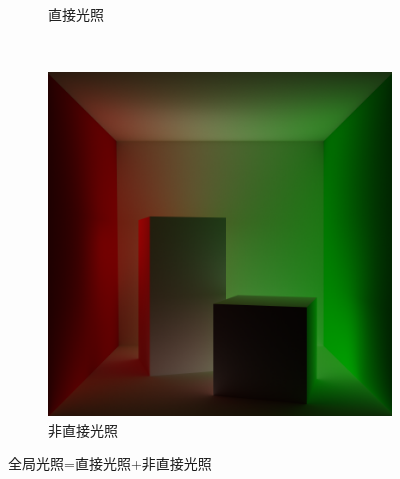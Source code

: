 \begin{figure}[h]
\begin{subfigure}{0.3\textwidth}
        \caption{直接光照}
    \end{subfigure}
    ~
    \begin{subfigure}{0.3\textwidth}
        \includegraphics[width=\textwidth]{img/indirect.png}
        \caption{非直接光照}
    \end{subfigure}
    \caption{全局光照=直接光照+非直接光照}
    \label{fig:direct_indirect}
\end{figure}


